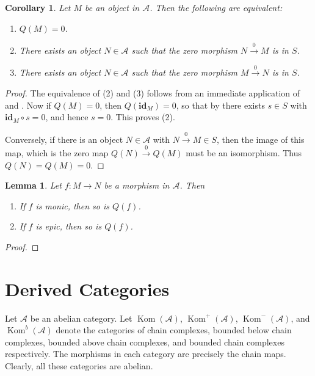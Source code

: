 \documentclass[11pt]{article}
\theoremstyle{thmstyle}
\newtheorem{lemma}[theorem]{Lemma}
\theoremstyle{defstyle}
\newtheorem{corollary}[theorem]{Corollary}
\newcommand{\id}{\mathbf{id}}
\newcommand{\scrA}{\mathscr{A}}
\newcommand{\Kom}{\operatorname{Kom}}
\begin{document}
\begin{corollary}
	Let $M$ be an object in $\scrA$. Then the following are equivalent: 
	\begin{enumerate}[label=(\arabic*)]
		\item $Q(M) = 0$. 
		\item There exists an object $N\in\scrA$ such that the zero morphism $N\xrightarrow{0} M$ is in $S$.
		\item There exists an object $N\in\scrA$ such that the zero morphism $M\xrightarrow{0} N$ is in $S$.
	\end{enumerate}
\end{corollary}
\begin{proof}
	The equivalence of (2) and (3) follows from an immediate application of  and . Now if $Q(M) = 0$, then $Q(\id_M) = 0$, so that by  there exists $s\in S$ with $\id_M\circ s = 0$, and hence $s = 0$. This proves (2).
	
	Conversely, if there is an object $N\in\scrA$ with $N\xrightarrow{0} M \in S$, then the image of this map, which is the zero map $Q(N)\xrightarrow{0} Q(M)$ must be an isomorphism. Thus $Q(N) = Q(M) = 0$.
\end{proof}

\begin{lemma}
	Let $f\colon M\to N$ be a morphism in $\scrA$. Then 
	\begin{enumerate}[label=(\arabic*)]
		\item If $f$ is monic, then so is $Q(f)$. 
		\item If $f$ is epic, then so is $Q(f)$.
	\end{enumerate}
\end{lemma}
\begin{proof}
\end{proof}

\section{Derived Categories}

Let $\scrA$ be an abelian category. Let $\Kom(\scrA)$, $\Kom^+(\scrA)$, $\Kom^-(\scrA)$, and $\Kom^b(\scrA)$ denote the categories of chain complexes, bounded below chain complexes, bounded above chain complexes, and bounded chain complexes respectively. The morphisms in each category are precisely the chain maps. Clearly, all these categories are abelian. 
\end{document}
